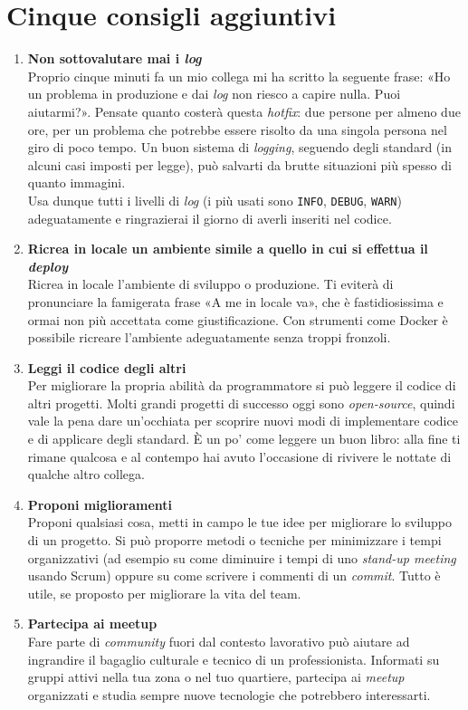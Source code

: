 \section{Cinque consigli aggiuntivi}

\begin{enumerate}

\item \textbf{Non sottovalutare mai i \emph{log}} \\
Proprio cinque minuti fa un mio collega mi ha scritto la seguente frase: «Ho un problema in produzione e dai \emph{log} non riesco a capire nulla. Puoi aiutarmi?». Pensate quanto costerà questa \emph{hotfix}: due persone per almeno due ore, per un problema che potrebbe essere risolto da una singola persona nel giro di poco tempo. Un buon sistema di \emph{logging}, seguendo degli standard (in alcuni casi imposti per legge), può salvarti da brutte situazioni più spesso di quanto immagini. \\
Usa dunque tutti i livelli di \emph{log} (i più usati sono \texttt{INFO}, \texttt{DEBUG}, \texttt{WARN}) adeguatamente e ringrazierai il giorno di averli inseriti nel codice.

\item \textbf{Ricrea in locale un ambiente simile a quello in cui si effettua il \emph{deploy}} \\
Ricrea in locale l’ambiente di sviluppo o produzione. Ti eviterà di pronunciare la famigerata frase «A me in locale va», che è fastidiosissima e ormai non più accettata come giustificazione. Con strumenti come Docker è possibile ricreare l’ambiente adeguatamente senza troppi fronzoli.

\item \textbf{Leggi il codice degli altri} \\
Per migliorare la propria abilità da programmatore si può leggere il codice di altri progetti. Molti grandi progetti di successo oggi sono \emph{open-source}, quindi vale la pena dare un’occhiata per scoprire nuovi modi di implementare codice e di applicare degli standard. È un po’ come leggere un buon libro: alla fine ti rimane qualcosa e al contempo hai avuto l’occasione di rivivere le nottate di qualche altro collega.

\item \textbf{Proponi miglioramenti} \\
Proponi qualsiasi cosa, metti in campo le tue idee per migliorare lo sviluppo di un progetto. Si può proporre metodi o tecniche per minimizzare i tempi organizzativi (ad esempio su come diminuire i tempi di uno \emph{stand-up meeting} usando Scrum) oppure su come scrivere i commenti di un \emph{commit}. Tutto è utile, se proposto per migliorare la vita del team.

\item \textbf{Partecipa ai meetup} \\
Fare parte di \emph{community} fuori dal contesto lavorativo può aiutare ad ingrandire il bagaglio culturale e tecnico di un professionista. Informati su gruppi attivi nella tua zona o nel tuo quartiere, partecipa ai \emph{meetup} organizzati e studia sempre nuove tecnologie che potrebbero interessarti.


\end{enumerate}